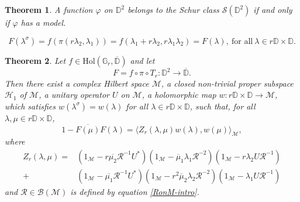 \documentclass[10pt,a4paper]{amsart}
\newtheorem{thm}{Theorem}
\renewcommand\phi{\varphi}
\begin{document}
\begin{thm}{}\label{aglerstheorembidisc}
A function $\phi$ on $\mathbb{D}^{2}$ belongs to the Schur class  $\mathcal{S}(\mathbb{D}^{2})$ if and only if $\phi$ has a model. 
\end{thm}

\begin{equation}\label{Finvolution}
 F(\lambda^{\sigma}) = f(\pi(r\lambda_{2},\lambda_{1})) = f(\lambda_{1}+r\lambda_{2},r\lambda_{1}\lambda_{2}) = F(\lambda), \ \text{for all} \
  \lambda \in  r\mathbb{D}\times\mathbb{D}.
\end{equation}

\begin{thm}\label{modelformulaforGr}
Let $f\in \mathrm{Hol}(\mathbb{G}_{r},\overline{\mathbb{D}})$ and let 
$$F = f \circ \pi \circ T_{r}: \mathbb{D}^{2} \to \overline{\mathbb{D}}.$$ Then 
there exist a complex Hilbert space $\mathcal{M}$,  a closed non-trivial proper subspace  $\mathcal{H}_{1}$ of $\mathcal{M}$,
a unitary operator $U$ on $\mathcal{M}$, 
 a holomorphic map $w: r\mathbb{D}\times \mathbb{D} \to \mathcal{M}$, which satisfies $w(\lambda^{\sigma}) = w(\lambda)$ for all $\lambda \in r\mathbb{D}\times\mathbb{D}$,   such that, for all $\lambda, \mu \in r\mathbb{D}\times\mathbb{D}$, 
\begin{equation}\label{Zrinnerproduct}
1-\overline{F(\mu)}F(\lambda) = \langle Z_{r}(\lambda,\mu)w(\lambda),w(\mu) \rangle_{\mathcal{M}}, 
\end{equation}
where
\begin{align*}
Z_{r}(\lambda,\mu) =& (1_{\mathcal{M}}-r\overline{\mu_{2}}\mathcal{R}^{-1}U^{*})(1_{\mathcal{M}}-  \overline{\mu}_{1}\lambda_{1}\mathcal{R}^{-2})(1_{\mathcal{M}}-r\lambda_{2}U\mathcal{R}^{-1}) \nonumber \\
+ & (1_{\mathcal{M}}-\overline{\mu_{1}}\mathcal{R}^{-1}U^{*})(1_{\mathcal{M}}-r^{2} \overline{\mu}_{2}\lambda_{2}\mathcal{R}^{-2})(1_{\mathcal{M}}-\lambda_{1}U\mathcal{R}^{-1})
\end{align*}
and $\mathcal{R}\in\mathcal{B(M)}$ is defined by equation \eqref{RonM-intro}.
\end{thm}
\end{document}
